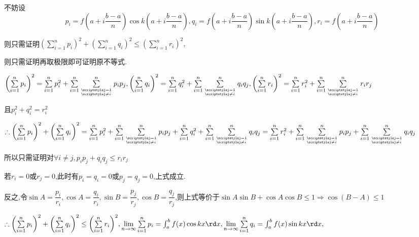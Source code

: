 不妨设\[{p_i} = f(a + i\dfrac{{b - a}}{n})\cos k(a + i\dfrac{{b - a}}{n}),{q_i} = f(a + i\dfrac{{b - a}}{n})\sin k(a + i\dfrac{{b - a}}{n}),{r_i} = f(a + i\dfrac{{b - a}}{n})\]

则只需证明${\left( {\sum\limits_{i = 1}^n {{p_i}} } \right)^2} + {\left( {\sum\limits_{i = 1}^n {{q_i}} } \right)^2} \le {\left( {\sum\limits_{i = 1}^n {{r_i}} } \right)^2},$

则只需证明再取极限即可证明原不等式.

${\left( {\sum\limits_{i = 1}^n {{p_i}} } \right)^2} = \sum\limits_{i = 1}^n {p_i^2}  + \sum\limits_{i = 1}^n {\sum\limits_{\scriptstylej = 1\hfill\atop
\scriptstylej \ne i\hfill}^n {{p_i}{p_j}} } ,{\left( {\sum\limits_{i = 1}^n {{q_i}} } \right)^2} = \sum\limits_{i = 1}^n {q_i^2}  + \sum\limits_{i = 1}^n {\sum\limits_{\scriptstylej = 1\hfill\atop
\scriptstylej \ne i\hfill}^n {{q_i}{q_j}} } ,{\left( {\sum\limits_{i = 1}^n {{r_i}} } \right)^2} = \sum\limits_{i = 1}^n {r_i^2}  + \sum\limits_{i = 1}^n {\sum\limits_{\scriptstylej = 1\hfill\atop
\scriptstylej \ne i\hfill}^n {{r_i}{r_j}} } $

且$p_i^2 + q_i^2 = r_i^2$

$\therefore {\left( {\sum\limits_{i = 1}^n {{p_i}} } \right)^2} + {\left( {\sum\limits_{i = 1}^n {{q_i}} } \right)^2} = \sum\limits_{i = 1}^n {p_i^2}  + \sum\limits_{i = 1}^n {\sum\limits_{\scriptstylej = 1\hfill\atop
\scriptstylej \ne i\hfill}^n {{p_i}{p_j}} }  + \sum\limits_{i = 1}^n {q_i^2}  + \sum\limits_{i = 1}^n {\sum\limits_{\scriptstylej = 1\hfill\atop
\scriptstylej \ne i\hfill}^n {{q_i}{q_j}} }  = \sum\limits_{i = 1}^n {r_i^2}  + \sum\limits_{i = 1}^n {\sum\limits_{\scriptstylej = 1\hfill\atop
\scriptstylej \ne i\hfill}^n {{p_i}{p_j}} }  + \sum\limits_{i = 1}^n {\sum\limits_{\scriptstylej = 1\hfill\atop
\scriptstylej \ne i\hfill}^n {{q_i}{q_j}} } $

所以只需证明对$\forall i \ne j,{p_i}{p_j} + {q_i}{q_j} \le {r_i}{r_j}$

若${r_i} = 0$或${r_j} = 0$,此时有${p_i} = {q_i} = 0$或${p_j} = {q_j} = 0$,上式成立.

反之,令$\sin A = \dfrac{{{p_i}}}{{{r_i}}},\cos A = \dfrac{{{q_i}}}{{{r_i}}},\sin B = \dfrac{{{p_j}}}{{{r_j}}},\cos B = \dfrac{{{q_j}}}{{{r_j}}}$,则上式等价于$\sin A\sin B + \cos A\cos B \le 1 \Rightarrow \cos (B - A) \le 1$

$\therefore {\left( {\sum\limits_{i = 1}^n {{p_i}} } \right)^2} + {\left( {\sum\limits_{i = 1}^n {{q_i}} } \right)^2} \le {\left( {\sum\limits_{i = 1}^n {{r_i}} } \right)^2},\mathop {\lim }\limits_{n \to \infty } \sum\limits_{i = 1}^n {{p_i}}  = \int_a^b {f(x)\cos kx\rd x} ,\mathop {\lim }\limits_{n \to \infty } \sum\limits_{i = 1}^n {{q_i}}  = \int_a^b {f(x)\sin kx\rd x} ,$

